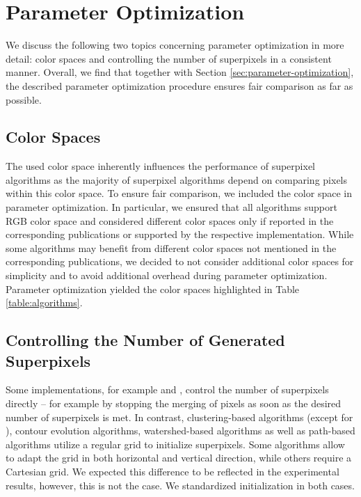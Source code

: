 \section{Parameter Optimization}

We discuss the following two topics concerning parameter optimization in more detail:
color spaces and controlling the number of superpixels in a consistent manner.
Overall, we find that together with Section \ref{sec:parameter-optimization},
the described parameter optimization procedure ensures fair comparison as far as possible.

\subsection{Color Spaces}

The used color space inherently influences the performance of superpixel algorithms as
the majority of superpixel algorithms depend on comparing pixels within this color space.
To ensure fair comparison, we included the color space in parameter optimization.
In particular, we ensured that all algorithms support RGB color space and considered
different color spaces only if reported in the corresponding publications or
supported by the respective implementation. While some algorithms may benefit from
different color spaces not mentioned in the corresponding publications, we decided to
not consider additional color spaces for simplicity and to avoid additional overhead
during parameter optimization. Parameter optimization yielded the color spaces
highlighted in Table \ref{table:algorithms}.

\subsection{Controlling the Number of Generated Superpixels}

\DeclarePairedDelimiter\ceil{\lceil}{\rceil}
\DeclarePairedDelimiter\floor{\lfloor}{\rfloor}

Some implementations, for example \ERS and \POISE, control the number of superpixels directly
-- for example by stopping the merging of pixels as soon as the desired number of superpixels is met.
In contrast, clustering-based algorithms (except for \DASP), contour evolution algorithms, watershed-based algorithms
as well as path-based algorithms utilize a regular grid to initialize superpixels.
Some algorithms allow to adapt the grid in both horizontal and vertical direction,
while others require a Cartesian grid. We expected this difference to be reflected in
the experimental results, however, this is not the case. We standardized initialization in both cases.